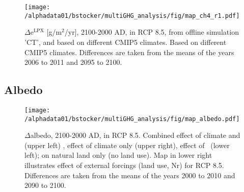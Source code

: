 \documentclass{myreport}
\begin{document}
\begin{figure}[ht!]
\begin{center}
  \texttt{[image: /alphadata01/bstocker/multiGHG\_analysis/fig/map\_ch4\_r1.pdf]}
\end{center}
\caption{$\Delta$e\chh$^{\text{LPX}}$ [g\chh/m$^2$/yr], 2100-2000 AD, in RCP 8.5, from offline simulation 'CT', and based on different CMIP5 climates. Based on different CMIP5 climates. Differences are taken from the means of the years 2006 to 2011 and 2095 to 2100.}
\label{fig:deCH4}
\end{figure}

\subsection{Albedo}
\label{sec:alb}
\begin{figure}[ht!]
\begin{center}
  \texttt{[image: /alphadata01/bstocker/multiGHG\_analysis/fig/map\_albedo.pdf]}
\end{center}
\caption{$\Delta$albedo, 2100-2000 AD, in RCP 8.5. Combined effect of climate and \coo (upper left) , effect of climate only (upper right), effect of \coo\ (lower left); on natural land only (no land use). Map in lower right illustrates effect of external forcings (land use, Nr) for RCP 8.5. Differences are taken from the means of the years 2000 to 2010 and 2090 to 2100.}
\label{fig:albedo}
\end{figure}


\clearpage


\end{document}
